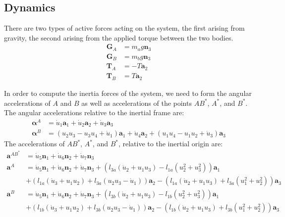 \documentclass[letterpaper,11pt]{article}
\newcommand{\bs}[1]{ \boldsymbol{ #1 } }
\begin{document}
\subsection*{Dynamics}
There are two types of active forces acting on the system, the first arising
from gravity, the second arising from the applied torque between the two
bodies.
\begin{align*}
  \bs{G}_A & = m_ag\bs{n}_3 \\
  \bs{G}_B & = m_bg\bs{n}_3 \\
  \bs{T}_A & = - T \bs{a}_2 \\
  \bs{T}_B & = T \bs{a}_2
\end{align*}

In order to compute the inertia forces of the system, we need to form the
angular accelerations of $A$ and $B$ as well as accelerations of the points
$AB^*$, $A^*$, and $B^*$. The angular accelerations relative to the inertial
frame are:
\begin{align*}
  \bs{\alpha}^A & = \dot{u}_1 \bs{a}_1 + \dot{u}_2 \bs{a}_2 + \dot{u}_3 \bs{a}_3\\
  \bs{\alpha}^B & =(u_2u_3 - u_3u_4 + \dot{u}_1)\bs{a}_1 + \dot{u}_4\bs{a}_2 + (u_1u_4 -
  u_1u_2 + \dot{u}_3)\bs{a}_3
\end{align*}
The accelerations of $AB^*$, $A^*$, and $B^*$, relative to the inertial
origin are:
\begin{align*}
  \bs{a}^{AB^*} &= \dot{u}_5\bs{n}_1 + \dot{u}_6\bs{n}_2 + \dot{u}_7\bs{n}_3
  \\
  \bs{a}^A &= \dot{u}_5\bs{n}_1 + \dot{u}_6\bs{n}_2 + \dot{u}_7\bs{n}_3
  + (l_{3a}(\dot{u}_2 + u_1u_3) - l_{1a}(u_2^2 + u_3^2))\bs{a}_1 \\
  &+ (l_{1a}(\dot{u}_3 + u_1u_2) + l_{3a}(u_2u_3 - \dot{u}_1))\bs{a}_2
  - (l_{1a}(\dot{u}_2 + u_1u_3) + l_{3a}(u_1^2 + u_2^2))\bs{a}_3
  \\
  \bs{a}^B &= \dot{u}_5\bs{n}_1 + \dot{u}_6\bs{n}_2 + \dot{u}_7\bs{n}_3
  + (l_{3b}(\dot{u}_2 + u_1u_3) - l_{1b}(u_2^2 + u_3^2))\bs{a}_1 \\
  &+ (l_{1b}(\dot{u}_3 + u_1u_2) + l_{3b}(u_2u_3 - \dot{u}_1))\bs{a}_2
  - (l_{1b}(\dot{u}_2 + u_1u_3) + l_{3b}(u_1^2 + u_2^2))\bs{a}_3
\end{align*}
\end{document}
